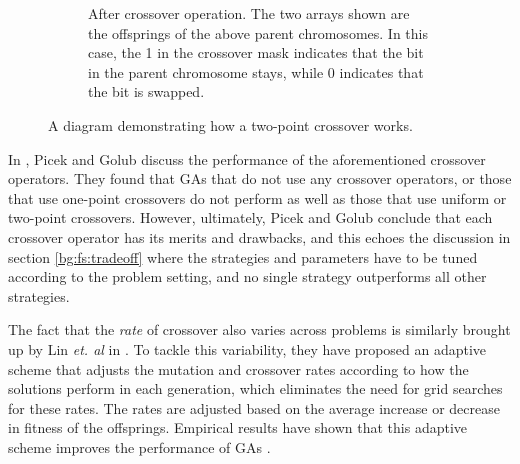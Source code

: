 \documentclass[12pt, twoside, a4paper]{report}
\begin{document}
\begin{figure}
\begin{subfigure}[b]{\textwidth}
\centering
{}
\caption{After crossover operation. The two arrays shown are the offsprings of the above parent chromosomes. In this case, the 1 in the crossover mask indicates that the bit in the parent chromosome stays, while 0 indicates that the bit is swapped.}
\label{bg:ga:crossover_b}
\end{subfigure}
\caption{A diagram demonstrating how a two-point crossover works.}
\label{bg:ga:crossover}
\end{figure}


In \cite{RefWorks:224}, Picek and Golub discuss the performance of the aforementioned crossover operators. They found that GAs that do not use any crossover operators, or those that use one-point crossovers do not perform as well as those that use uniform or two-point crossovers. However, ultimately, Picek and Golub conclude that each crossover operator has its merits and drawbacks, and this echoes the discussion in section \ref{bg:fs:tradeoff} where the strategies and parameters have to be tuned according to the problem setting, and no single strategy outperforms all other strategies.

The fact that the \textit{rate} of crossover also varies across problems is similarly brought up by Lin \textit{et. al} in \cite{RefWorks:225}. To tackle this variability, they have proposed an adaptive scheme that adjusts the mutation and crossover rates according to how the solutions perform in each generation, which eliminates the need for grid searches for these rates. The rates are adjusted based on the average increase or decrease in fitness of the offsprings. Empirical results have shown that this adaptive scheme improves the performance of GAs \cite{RefWorks:225, RefWorks:226}.

\end{document}
